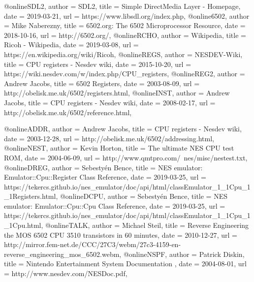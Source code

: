 @online{SDL2,
	author = {SDL2},
	title = {Simple DirectMedia Layer - Homepage},
	date = {2019-03-21},
	url = {https://www.libsdl.org/index.php},
}
@online{6502,
	author = {Mike Naberezny},
	title = {6502.org: The 6502 Microprocessor Resource},
	date = {2018-10-16},
	url = {http://6502.org/},
}
@online{RCHO,
	author = {Wikipedia},
	title = {Ricoh - Wikipedia},
	date = {2019-03-08},
	url = {https://en.wikipedia.org/wiki/Ricoh},
}
@online{REGS,
	author = {NESDEV-Wiki},
	title = {CPU registers - Nesdev wiki},
	date = {2015-10-20},
	url = {https://wiki.nesdev.com/w/index.php/CPU_registers},
}
@online{REG2,
	author = {Andrew Jacobs},
	title = {6502 Registers},
	date = {2003-08-09},
	url = {http://obelisk.me.uk/6502/registers.html},
}
@online{INST,
	author = {Andrew Jacobs},
	title = {CPU registers - Nesdev wiki},
	date = {2008-02-17},
	url = {http://obelisk.me.uk/6502/reference.html},
}

@online{ADDR,
	author = {Andrew Jacobs},
	title = {CPU registers - Nesdev wiki},
	date = {2003-12-28},
	url = {http://obelisk.me.uk/6502/addressing.html},
}
@online{NEST,
	author = {Kevin Horton},
	title = {The ultimate NES CPU test ROM},
	date = {2004-06-09},
	url = {http://www.qmtpro.com/~nes/misc/nestest.txt},
}
@online{DREG,
	author = {Sebestyén Bence},
	title = {NES emulator: Emulator::Cpu::Register Class Reference},
	date = {2019-03-25},
	url = {https://tekercs.github.io/nes_emulator/doc/api/html/classEmulator_1_1Cpu_1_1Registers.html},
}
@online{DCPU,
	author = {Sebestyén Bence},
	title = {NES emulator: Emulator::Cpu::Cpu Class Reference},
	date = {2019-03-25},
	url = {https://tekercs.github.io/nes_emulator/doc/api/html/classEmulator_1_1Cpu_1_1Cpu.html},
}
@online{TALK,
	author = {Michael Steil},
	title = {Reverse Engineering the MOS 6502 CPU 3510 transistors in 60 minutes},
	date = {2010-12-27},
	url = {http://mirror.fem-net.de/CCC/27C3/webm/27c3-4159-en-reverse_engineering_mos_6502.webm},
}
@online{NSPF,
	author = {Patrick Diskin},
	title = {Nintendo Entertainment System Documentation },
	date = {2004-08-01},
	url = {http://www.nesdev.com/NESDoc.pdf},
}

